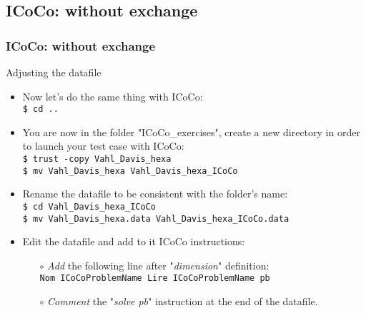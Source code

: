 \documentclass[10pt, hyperref={unicode=true,pdfusetitle, bookmarks=true,bookmarksnumbered=false,bookmarksopen=false, breaklinks=false,pdfborder={0 0 1},backref=true,colorlinks=true,linkcolor=darkblue,pageanchor, urlcolor=darkblue}]{beamer}
\begin{document}
\subsection{{\bf{ICoCo: without exchange}}}
\begin{frame}
\frametitle{ICoCo: without exchange}

\begin{block}{Adjusting the datafile}
\begin{itemize}
\item Now let's do the same thing with ICoCo:\\
\texttt{\$ cd ..}\\
\item You are now in the folder "ICoCo\_exercises", create a new directory in order to launch your test case with ICoCo:\\
\texttt{\$ trust -copy Vahl\_Davis\_hexa}\\
\texttt{\$ mv Vahl\_Davis\_hexa Vahl\_Davis\_hexa\_ICoCo}\\
\item Rename the datafile to be consistent with the folder's name:\\
\texttt{\$ cd Vahl\_Davis\_hexa\_ICoCo}\\
\texttt{\$ mv Vahl\_Davis\_hexa.data Vahl\_Davis\_hexa\_ICoCo.data}\\
\item Edit the datafile and add to it ICoCo instructions:
    \begin{itemize}
    \item [$\circ$] \textit{Add} the following line after "\textit{dimension}" definition:\\
    \texttt{Nom ICoCoProblemName Lire ICoCoProblemName pb}
    \item [$\circ$] \textit{Comment} the "\textit{solve pb}" instruction at the end of the datafile.
    \end{itemize}
\end{itemize}
\end{block}

\end{frame}
\end{document}
